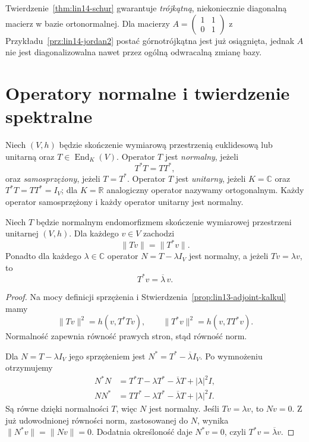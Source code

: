 \begin{uwaga}
\label{rem:lin14-schur-not-diagonal}
Twierdzenie~\ref{thm:lin14-schur}
gwarantuje \emph{trójkątną}, niekoniecznie
diagonalną macierz w bazie ortonormalnej.
Dla macierzy
\(A=\begin{pmatrix}1&1\\0&1\end{pmatrix}\)
z Przykładu~\ref{prz:lin14-jordan2}
postać górnotrójkątna jest już osiągnięta,
jednak \(A\) nie jest diagonalizowalna
nawet przez ogólną odwracalną zmianę bazy.
\end{uwaga}

\section{Operatory normalne i twierdzenie spektralne}
\label{sec:lin14-normalne}

\begin{definicja}
\label{def:lin14-normal}
Niech \((V,h)\) będzie skończenie wymiarową
przestrzenią euklidesową lub unitarną
oraz \(T\in\operatorname{End}_K(V)\).
Operator \(T\) jest \emph{normalny},
jeżeli
\[
 T^*T=TT^*,
\]
oraz \emph{samosprzężony},
jeżeli \(T=T^*\).
Operator \(T\) jest \emph{unitarny},
jeżeli \(K=\mathbb C\) oraz
\(T^*T=TT^*=I_V\);
dla \(K=\mathbb R\) analogiczny
operator nazywamy ortogonalnym.
Każdy operator samosprzężony
i każdy operator unitarny
jest normalny.
\end{definicja}

\begin{stwierdzenie}
\label{prop:lin14-normal-norm}
Niech \(T\) będzie normalnym
endomorfizmem skończenie wymiarowej
przestrzeni unitarnej \((V,h)\).
Dla każdego \(v\in V\) zachodzi
\[
 \|Tv\|=\|T^*v\|.
\]
Ponadto dla każdego \(\lambda\in\mathbb C\)
operator \(N=T-\lambda I_V\) jest normalny,
a jeżeli \(Tv=\lambda v\), to
\[
 T^*v=\overline\lambda\,v.
\]
\end{stwierdzenie}
\begin{proof}
Na mocy definicji sprzężenia i
Stwierdzenia~\ref{prop:lin13-adjoint-kalkul}
mamy
\[
 \|Tv\|^2=h(v,T^*Tv),\qquad
 \|T^*v\|^2=h(v,TT^*v).
\]
Normalność zapewnia równość
prawych stron, stąd równość norm.

Dla \(N=T-\lambda I_V\)
jego sprzężeniem jest
\(N^*=T^*-\overline\lambda I_V\).
Po wymnożeniu otrzymujemy
\[
 \begin{aligned}
 N^*N&=T^*T-\lambda T^*
             -\overline\lambda T+|\lambda|^2I,\\
 NN^*&=TT^*-\lambda T^*
             -\overline\lambda T+|\lambda|^2I.
 \end{aligned}
\]
Są równe dzięki normalności \(T\),
więc \(N\) jest normalny.
Jeśli \(Tv=\lambda v\), to \(Nv=0\).
Z już udowodnionej równości norm,
zastosowanej do \(N\), wynika
\(\|N^*v\|=\|Nv\|=0\).
Dodatnia określoność daje
\(N^*v=0\), czyli
\(T^*v=\overline\lambda v\).
\end{proof}

